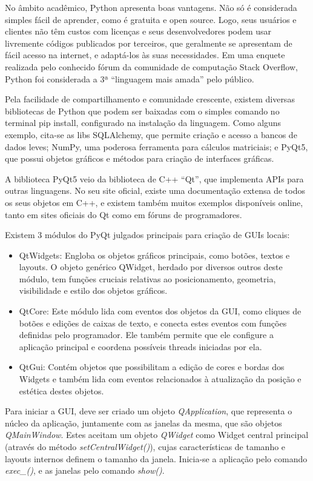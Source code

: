 No âmbito acadêmico, Python apresenta boas vantagens. Não só é considerada simples fácil de aprender, como é gratuita e open source. Logo, seus usuários e clientes não têm custos com licenças e seus desenvolvedores podem usar livremente códigos publicados por terceiros, que geralmente se apresentam de fácil acesso na internet, e adaptá-los às suas necessidades. Em uma enquete realizada pelo conhecido fórum da comunidade de computação Stack Overflow, Python foi considerada a 3ª “linguagem mais amada” pelo público.

Pela facilidade de compartilhamento e comunidade crescente, existem diversas bibliotecas de Python que podem ser baixadas com o simples comando no terminal pip install, configurado na instalação da linguagem. Como alguns exemplo, cita-se as libs SQLAlchemy, que permite criação e acesso a bancos de dados leves; NumPy, uma poderosa ferramenta para cálculos matriciais; e PyQt5, que possui objetos gráficos e métodos para criação de interfaces gráficas.

A biblioteca PyQt5 veio da biblioteca de C++ “Qt”, que implementa APIs para outras linguagens. No seu site oficial, existe uma documentação extensa de todos os seus objetos em C++, e existem também muitos exemplos disponíveis online, tanto em sites oficiais do Qt como em fóruns de programadores.

Existem 3 módulos do PyQt julgados principais para criação de GUIs locais:

\begin{itemize}
	\item QtWidgets: Engloba os objetos gráficos principais, como botões, textos e layouts. O objeto genérico QWidget, herdado por diversos outros deste módulo, tem funções cruciais relativas ao posicionamento, geometria, visibilidade e estilo dos objetos gráficos.
	\item QtCore: Este módulo lida com eventos dos objetos da GUI, como cliques de botões e edições de caixas de texto, e conecta estes eventos com funções definidas pelo programador. Ele também permite que ele configure a aplicação principal e coordena possíveis threads iniciadas por ela.
	\item QtGui: Contém objetos que possibilitam a edição de cores e bordas dos Widgets e também lida com eventos relacionados à atualização da posição e estética destes objetos.
\end{itemize}

Para iniciar a GUI, deve ser criado um objeto \emph{QApplication}, que representa o núcleo da aplicação, juntamente com as janelas da mesma, que são objetos \emph{QMainWindow}. Estes aceitam um objeto \emph{QWidget} como Widget central principal (através do método \emph{setCentralWidget()}), cujas características de tamanho e layouts internos definem o tamanho da janela. Inicia-se a aplicação pelo comando \emph{exec\_()}, e as janelas pelo comando \emph{show()}.

